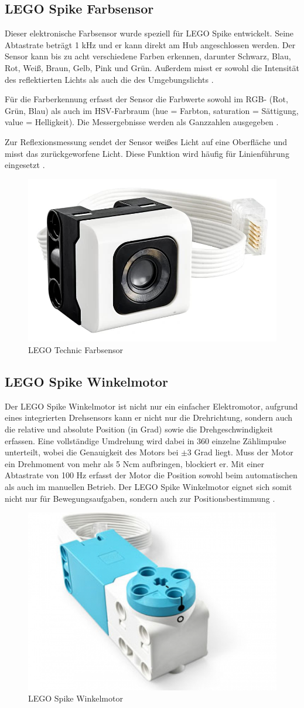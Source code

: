 \subsection{LEGO Spike Farbsensor}
Dieser elektronische Farbsensor wurde speziell für LEGO Spike entwickelt. Seine Abtastrate beträgt 1 kHz und er kann direkt am Hub angeschlossen werden. Der Sensor kann bis zu acht verschiedene Farben erkennen, darunter Schwarz, Blau, Rot, Weiß, Braun, Gelb, Pink und Grün. Außerdem misst er sowohl die Intensität des reflektierten Lichts als auch die des Umgebungslichts \autocite{lego2020colorsensor}\autocite{legoeducation2020spikesensors}.

Für die Farberkennung erfasst der Sensor die Farbwerte sowohl im RGB- (Rot, Grün, Blau) als auch im HSV-Farbraum (hue = Farbton, saturation = Sättigung, value = Helligkeit). Die Messergebnisse werden als Ganzzahlen ausgegeben \autocite{lego2020colorsensor}.

Zur Reflexionsmessung sendet der Sensor weißes Licht auf eine Oberfläche und misst das zurückgeworfene Licht. Diese Funktion wird häufig für Linienführung eingesetzt \autocite{betzold2025colorsensor}\autocite{lego2020colorsensor}.

\begin{figure}[H]
	\centering
	\includegraphics[width=0.4\linewidth]{images/Farbsensor}
	\caption[LEGO Technic Farbsensor Quelle:\autocite{legoeducation2020spikesensors}]{LEGO Technic Farbsensor}
	\label{fig:farbsensor}
\end{figure}

\subsection{LEGO Spike Winkelmotor}
Der LEGO Spike Winkelmotor ist nicht nur ein einfacher Elektromotor, aufgrund eines integrierten Drehsensors kann er nicht nur die Drehrichtung, sondern auch die relative und absolute Position (in Grad) sowie die Drehgeschwindigkeit erfassen. Eine vollständige Umdrehung wird dabei in 360 einzelne Zählimpulse unterteilt, wobei die Genauigkeit des Motors bei $\pm3$ Grad liegt. Muss der Motor ein Drehmoment von mehr als 5 Ncm aufbringen, blockiert er. Mit einer Abtastrate von 100 Hz erfasst der Motor die Position sowohl beim automatischen als auch im manuellen Betrieb. Der LEGO Spike Winkelmotor eignet sich somit nicht nur für Bewegungsaufgaben, sondern auch zur Positionsbestimmung \autocite{legoeducation2020spikesensors}.

\begin{figure}[H]
	\centering
	\includegraphics[width=0.4\linewidth]{images/Motor}
	\caption[LEGO Spike Winkelmotor Quelle:\autocite{legoeducation2020spikesensors}]{LEGO Spike Winkelmotor}
	\label{fig:motor}
\end{figure}

